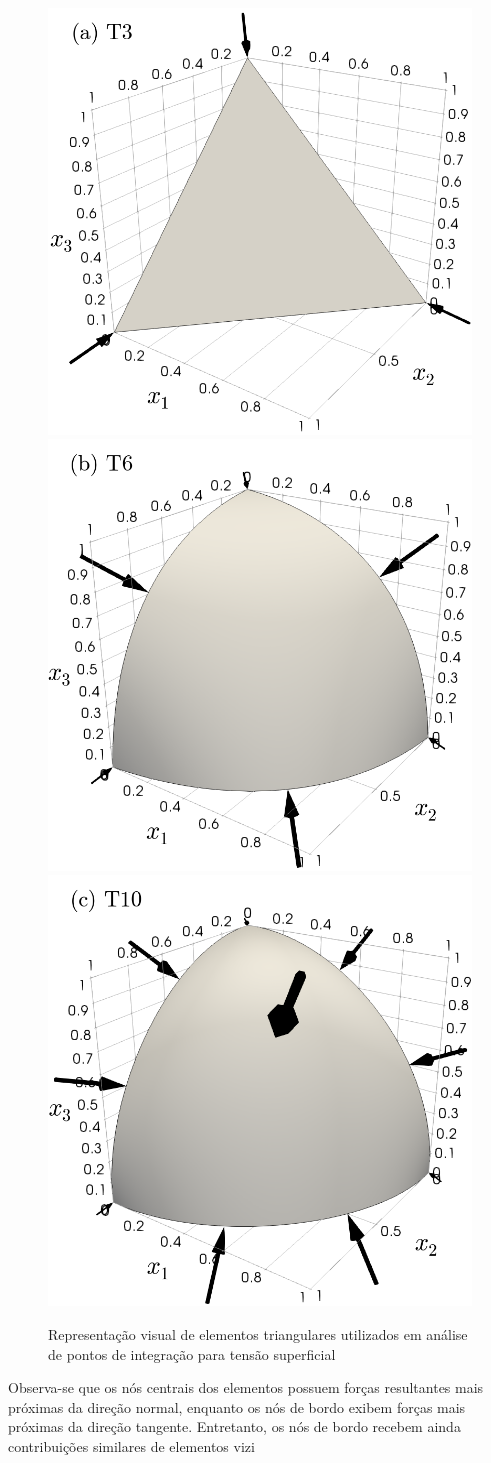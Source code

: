 \documentclass[Tese.tex]{subfiles}
\begin{document}
\begin{figure}[!htb]
	\centering
	\caption{Representação visual de elementos triangulares utilizados em análise de pontos de integração para tensão superficial}
	\label{fig:SurfaceTensionTest-Paraview}
	\includegraphics[scale=0.235]{Figuras/SurfaceTensionTest/Paraview/T3.png}\quad\includegraphics[scale=0.235]{Figuras/SurfaceTensionTest/Paraview/T6.png}\quad\includegraphics[scale=0.235]{Figuras/SurfaceTensionTest/Paraview/T10.png}
\end{figure}


Observa-se que os nós centrais dos elementos possuem forças resultantes mais próximas da direção normal, enquanto os nós de bordo exibem forças mais próximas da direção tangente. Entretanto, os nós de bordo recebem ainda contribuições similares de elementos vizi
\end{document}
